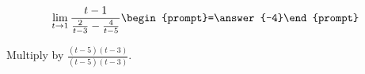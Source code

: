 \documentclass{ximera}
\author{Bart Snapp}
\begin{document}
\begin{exercise}

\[
\lim_{t\to 1 } \frac{t-1}{\frac{2}{t-3}-\frac{4}{t-5}}  \begin{prompt}=\answer{-4}\end{prompt}
\]
\begin{hint}
Multiply by $\frac{(t-5) (t-3)}{(t-5) (t-3)}$.
\end{hint}
\end{exercise}
\end{document}
